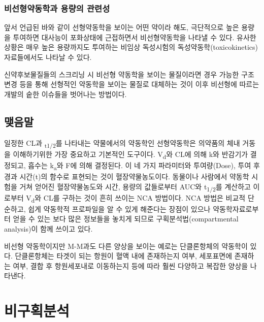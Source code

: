 \documentclass[
  11pt,
  krantz2, a4paper, twoside]{krantz}
\begin{document}
\hypertarget{uxbe44uxc120uxd615uxc57duxb3d9uxd559uxacfc-uxc6a9uxb7c9uxc758-uxad00uxb828uxc131}{%
\subsection{비선형약동학과 용량의 관련성}\label{uxbe44uxc120uxd615uxc57duxb3d9uxd559uxacfc-uxc6a9uxb7c9uxc758-uxad00uxb828uxc131}}

앞서 언급된 바와 같이 선형약동학을 보이는 어떤 약이라 해도, 극단적으로 높은 용량을 투여하면 대사능이 포화상태에 근접하면서 비선형약동학을 나타낼 수 있다.
유사한 상황은 매우 높은 용량까지도 투여하는 비임상 독성시험의 독성약동학(toxicokinetics)자료들에서도 나타날 수 있다.

신약후보물질들의 스크리닝 시 비선형 약동학을 보이는 물질이라면 경우 가능한 구조변경 등을 통해 선형적인 약동학을 보이는 물질로 대체하는 것이 이후 비선형에 따르는 개발의 숱한 이슈들을 벗어나는 방법이다.

\hypertarget{uxb9fauxc74cuxb9d0}{%
\section{맺음말}\label{uxb9fauxc74cuxb9d0}}

일정한 CL과 \textsubscript{t1/2}를 나타내는 약물에서의 약동학인 선형약동학은 의약품의 체내 거동을 이해하기위한 가장 중요하고 기본적인 도구이다.
V\textsubscript{d}와 CL에 의해 k와 반감기가 결정되고, 흡수는 k\textsubscript{a}와 F에 의해 결정된다.
이 네 가지 파라미터와 투여량(Dose), 투여 후 경과 시간(t)의 함수로 표현되는 것이 혈장약물농도이다.
동물이나 사람에서 약동학 시험을 거쳐 얻어진 혈장약물농도와 시간, 용량의 값들로부터 AUC와 t\textsubscript{1/2}를 계산하고 이로부터 V\textsubscript{d}와 CL를 구하는 것이 흔히 쓰이는 NCA 방법이다.
NCA 방법은 비교적 단순하고, 쉽게 약동학적 프로파일을 알 수 있게 해준다는 장점이 있으나 약동학자료로부터 얻을 수 있는 보다 많은 정보들을 놓치게 되므로 구획분석법(compartmental analysis)이 함께 쓰이고 있다.

비선형 약동학이지만 M-M과도 다른 양상을 보이는 예로는 단클론항체의 약동학이 있다.
단클론항체는 타겟이 되는 항원이 혈액 내에 존재하는지 여부, 세포표면에 존재하는 여부, 결합 후 항원세포내로 이동하는지 등에 따라 훨씬 다양하고 복잡한 양상을 나타낸다.

\hypertarget{uxbe44uxad6cuxd68duxbd84uxc11d}{%
\chapter{비구획분석}\label{uxbe44uxad6cuxd68duxbd84uxc11d}}
\end{document}
